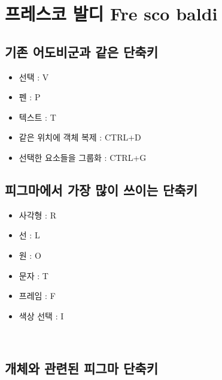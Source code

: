 \documentclass[12pt, a4paper, oneside]{book}
\begin{document}
	\newpage
	\chapter{ 프레스코 발디 Fre sco baldi } 


		\newpage
		\minitoc				%


	\newpage  \null


	\section{기존 어도비군과 같은 단축키}
			\begin{itemize}[topsep=0.0em, parsep=0.0em, itemsep=0em, leftmargin=6.0em, labelwidth=3em, labelsep=1em] 
			\item 	선택 : V
			\item 	펜 : P
			\item 	텍스트 : T
			\item 	같은 위치에 객체 복제 : CTRL+D
			\item 	선택한 요소들을 그룹화 :  CTRL+G
			\end{itemize}



	\section{피그마에서 가장 많이 쓰이는 단축키}


			\begin{itemize}[topsep=0.0em, parsep=0.0em, itemsep=0em, leftmargin=6.0em, labelwidth=3em, labelsep=1em] 
			\item 	사각형 : R
			\item 	선 : L
			\item 	원 : O
			\item 	문자 : T
			\item 	프레임 : F
			\item 	색상 선택 : I
			\end{itemize}
 


	\section{개체와 관련된 피그마 단축키}
 
\end{document}
